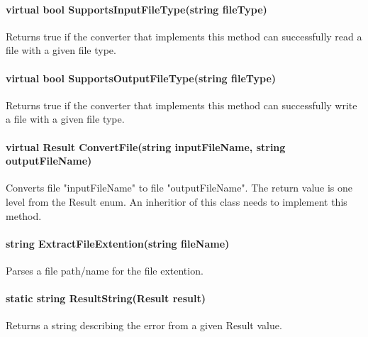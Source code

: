         \paragraph{virtual bool SupportsInputFileType(string fileType)}  
        \hfill \break
        Returns true if the converter that implements this method can successfully read a file with a given file type.

        \paragraph{virtual bool SupportsOutputFileType(string fileType)}
        \hfill \break
        Returns true if the converter that implements this method can successfully write a file with a given file type.

        \paragraph{virtual Result ConvertFile(string inputFileName, string outputFileName)}
        \hfill \break
        Converts file "inputFileName" to file "outputFileName".  The return value is one level from the Result enum.  An inheritior of this class needs to implement this method.

        \paragraph{string ExtractFileExtention(string fileName)}
        \hfill \break
        Parses a file path/name for the file extention.

        \paragraph{static string ResultString(Result result)}
        \hfill \break
        Returns a string describing the error from a given Result value.
